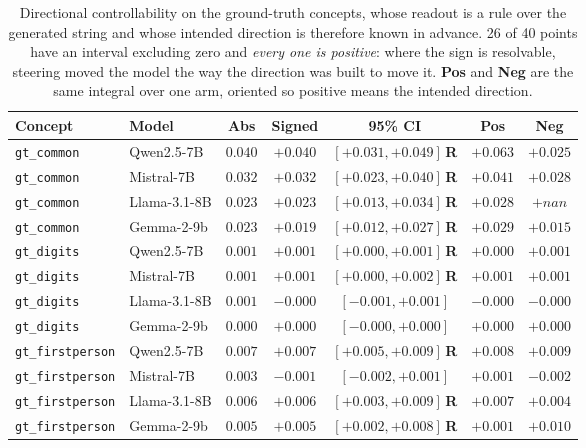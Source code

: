 \begin{table}[htbp]
  \caption{Directional controllability on the ground-truth concepts,
  whose readout is a rule over the generated string and whose intended
  direction is therefore known in advance. 26 of 40 points have an interval
  excluding zero and \emph{every one is positive}: where the sign is
  resolvable, steering moved the model the way the direction was built to move
  it. \textbf{Pos} and \textbf{Neg} are the same integral over one arm,
  oriented so positive means the intended direction.}
  \label{tab:groundtruth}
  \centering
  \footnotesize
  \begin{tabular}{llccccc}
    \toprule
    Concept & Model & Abs & Signed & 95\% CI & Pos & Neg \\
    \midrule
    \texttt{gt\_common} & Qwen2.5-7B & $0.040$ & $+0.040$ & $[+0.031, +0.049]$\,\textbf{R} & $+0.063$ & $+0.025$ \\
    \texttt{gt\_common} & Mistral-7B & $0.032$ & $+0.032$ & $[+0.023, +0.040]$\,\textbf{R} & $+0.041$ & $+0.028$ \\
    \texttt{gt\_common} & Llama-3.1-8B & $0.023$ & $+0.023$ & $[+0.013, +0.034]$\,\textbf{R} & $+0.028$ & $+nan$ \\
    \texttt{gt\_common} & Gemma-2-9b & $0.023$ & $+0.019$ & $[+0.012, +0.027]$\,\textbf{R} & $+0.029$ & $+0.015$ \\
    \texttt{gt\_digits} & Qwen2.5-7B & $0.001$ & $+0.001$ & $[+0.000, +0.001]$\,\textbf{R} & $+0.000$ & $+0.001$ \\
    \texttt{gt\_digits} & Mistral-7B & $0.001$ & $+0.001$ & $[+0.000, +0.002]$\,\textbf{R} & $+0.001$ & $+0.001$ \\
    \texttt{gt\_digits} & Llama-3.1-8B & $0.001$ & $-0.000$ & $[-0.001, +0.001]$ & $-0.000$ & $-0.000$ \\
    \texttt{gt\_digits} & Gemma-2-9b & $0.000$ & $+0.000$ & $[-0.000, +0.000]$ & $+0.000$ & $+0.000$ \\
    \texttt{gt\_firstperson} & Qwen2.5-7B & $0.007$ & $+0.007$ & $[+0.005, +0.009]$\,\textbf{R} & $+0.008$ & $+0.009$ \\
    \texttt{gt\_firstperson} & Mistral-7B & $0.003$ & $-0.001$ & $[-0.002, +0.001]$ & $+0.001$ & $-0.002$ \\
    \texttt{gt\_firstperson} & Llama-3.1-8B & $0.006$ & $+0.006$ & $[+0.003, +0.009]$\,\textbf{R} & $+0.007$ & $+0.004$ \\
    \texttt{gt\_firstperson} & Gemma-2-9b & $0.005$ & $+0.005$ & $[+0.002, +0.008]$\,\textbf{R} & $+0.001$ & $+0.010$ \\

\end{tabular}
\end{table}
